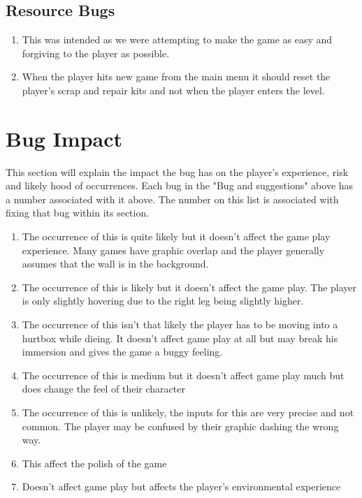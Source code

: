 \documentclass{article}
\begin{document}
\subsection*{Resource Bugs}
\begin{enumerate}
		\item This was intended as we were attempting to make the game as easy and forgiving to the player as possible. 
			\item When the player hits new game from the main menu it should reset the player's scrap and repair kits and not when the player enters the level. 
		
\end{enumerate}


\section*{Bug Impact}
This section will explain the impact the bug has on the player's experience, risk and likely hood of occurrences. Each bug in the "Bug and suggestions" above has a number associated with it above. The number on this list is associated with fixing that bug within its section.  

\begin{enumerate}
	\item The occurrence of this is quite likely but it doesn't affect the game play experience. Many games have graphic overlap and the player generally assumes that the wall is in the background.
	\item The occurrence of this is likely but it doesn't affect the game play. The player is only slightly hovering due to the right leg being slightly higher. 
	\item The occurrence of this isn't that likely the player has to be moving into a hurtbox while dieing. It doesn't affect game play at all but may break his immersion and gives the game a buggy feeling.
	\item  The occurrence of this is medium but it doesn't affect game play much but does change the feel of their character
	\item The occurrence of this is unlikely, the inputs for this are very precise and not common. The player may be confused by their graphic dashing the wrong way.
	\item This affect the polish of the game
	\item Doesn't affect game play but affects the player's environmental experience
\end{enumerate}
\end{document}
